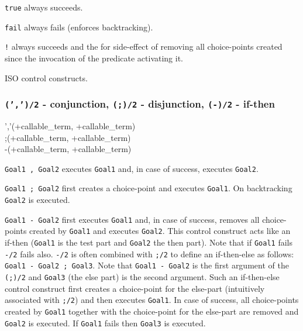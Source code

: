 \Description

\texttt{true} always succeeds.

\texttt{fail} always fails (enforces backtracking).

\texttt{!} always succeeds and the for side-effect of removing all
choice-points created since the invocation of the predicate activating it.

\PlErrorsNone

\Portability

ISO control constructs.

\subsubsection{\texttt{(',')/2} - conjunction,
               \texttt{(;)/2} - disjunction,
               \texttt{(-{\gt})/2} - if-then}

\begin{TemplatesOneCol}
','(+callable\_term, +callable\_term)\\
;(+callable\_term, +callable\_term)\\
-{\gt}(+callable\_term, +callable\_term)

\end{TemplatesOneCol}

\Description

\texttt{Goal1 , Goal2} executes \texttt{Goal1} and, in case of
success, executes \texttt{Goal2}.

\texttt{Goal1 ; Goal2} first creates a choice-point and executes
\texttt{Goal1}. On backtracking \texttt{Goal2} is executed.

\texttt{Goal1 -{\gt} Goal2} first executes \texttt{Goal1} and,
in case of success, removes all choice-points created by \texttt{Goal1} and
executes \texttt{Goal2}. This control construct acts like an if-then
(\texttt{Goal1} is the test part and \texttt{Goal2} the then part). Note that
if \texttt{Goal1} fails \texttt{-{\gt}/2} fails also. \texttt{-{\gt}/2} is
often combined with \texttt{;/2} to define an if-then-else as follows:
\texttt{Goal1 -{\gt} Goal2 ; Goal3}. Note that \texttt{Goal1 -{\gt} Goal2}
is the first argument of the \texttt{(;)/2} and \texttt{Goal3} (the else
part) is the second argument. Such an if-then-else control construct first
creates a choice-point for the else-part (intuitively associated with
\texttt{;/2}) and then executes \texttt{Goal1}. In case of success, all
choice-points created by \texttt{Goal1} together with the choice-point for
the else-part are removed and \texttt{Goal2} is executed. If \texttt{Goal1}
fails then \texttt{Goal3} is executed.

